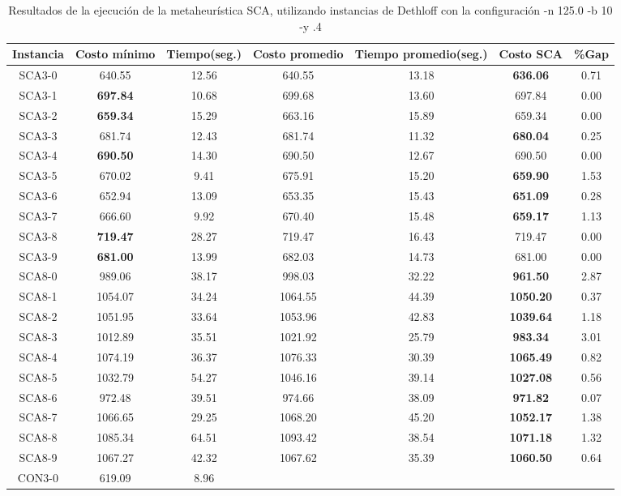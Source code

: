 \begin{table}[ht]
\caption{Resultados de la ejecución de la metaheurística SCA, utilizando instancias de Dethloff con la configuración -n 125.0 -b 10 -y .4}
\centering
\small
\begin{tabular}{c c c c c c c}
\hline\hline
Instancia & Costo mínimo & Tiempo(seg.) & Costo promedio & Tiempo promedio(seg.) & Costo SCA & \%Gap \\ [0.5ex]
\hline
SCA3-0 & 640.55 & 12.56 & 
640.55 & 13.18 & \bf{636.06} & 
0.71\\SCA3-1 & \bf{697.84} & 10.68 & 
699.68 & 13.60 & 697.84 & 0.00\\
SCA3-2 & \bf{659.34} & 15.29 & 
663.16 & 15.89 & 659.34 & 0.00\\
SCA3-3 & 681.74 & 12.43 & 
681.74 & 11.32 & \bf{680.04} & 
0.25\\SCA3-4 & \bf{690.50} & 14.30 & 
690.50 & 12.67 & 690.50 & 0.00\\
SCA3-5 & 670.02 & 9.41 & 
675.91 & 15.20 & \bf{659.90} & 
1.53\\SCA3-6 & 652.94 & 13.09 & 
653.35 & 15.43 & \bf{651.09} & 
0.28\\SCA3-7 & 666.60 & 9.92 & 
670.40 & 15.48 & \bf{659.17} & 
1.13\\SCA3-8 & \bf{719.47} & 28.27 & 
719.47 & 16.43 & 719.47 & 0.00\\
SCA3-9 & \bf{681.00} & 13.99 & 
682.03 & 14.73 & 681.00 & 0.00\\
SCA8-0 & 989.06 & 38.17 & 
998.03 & 32.22 & \bf{961.50} & 
2.87\\SCA8-1 & 1054.07 & 34.24 & 
1064.55 & 44.39 & \bf{1050.20} & 
0.37\\SCA8-2 & 1051.95 & 33.64 & 
1053.96 & 42.83 & \bf{1039.64} & 
1.18\\SCA8-3 & 1012.89 & 35.51 & 
1021.92 & 25.79 & \bf{983.34} & 
3.01\\SCA8-4 & 1074.19 & 36.37 & 
1076.33 & 30.39 & \bf{1065.49} & 
0.82\\SCA8-5 & 1032.79 & 54.27 & 
1046.16 & 39.14 & \bf{1027.08} & 
0.56\\SCA8-6 & 972.48 & 39.51 & 
974.66 & 38.09 & \bf{971.82} & 
0.07\\SCA8-7 & 1066.65 & 29.25 & 
1068.20 & 45.20 & \bf{1052.17} & 
1.38\\SCA8-8 & 1085.34 & 64.51 & 
1093.42 & 38.54 & \bf{1071.18} & 
1.32\\SCA8-9 & 1067.27 & 42.32 & 
1067.62 & 35.39 & \bf{1060.50} & 
0.64\\CON3-0 & 619.09 & 8.96 & 

\end{tabular}
\end{table}
